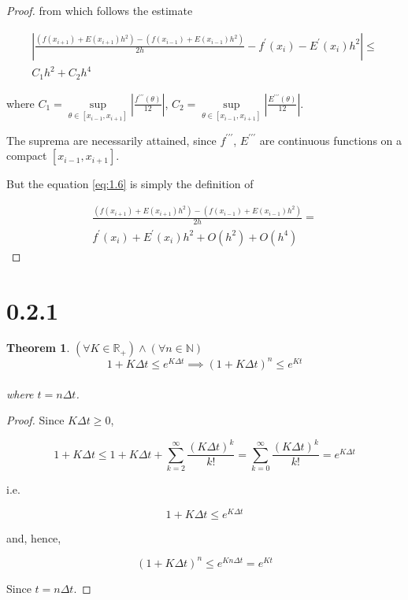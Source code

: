 \documentclass[a4paper]{amsproc}
\theoremstyle{plain}
\newtheorem*{thm}{Theorem}
\theoremstyle{definition}
\theoremstyle{remark}
\numberwithin{equation}{section}
\renewcommand{\le}{\leqslant}\renewcommand{\leq}{\leqslant}
\renewcommand{\ge}{\geqslant}\renewcommand{\geq}{\geqslant}
\begin{document}
\begin{proof}
from which follows the estimate

\begin{multline}\label{eq:1.6}
\left\lvert \frac{(f(x_{i+1})+E(x_{i+1})h^2)-(f(x_{i-1})+E(x_{i-1})h^2)}{2h} - f^{\prime}(x_i)-E^{\prime}(x_i)h^2 \right\rvert \le \\ 
C_1 h^2+C_2 h^4
\end{multline}
 
where $ C_1 = \underset{\theta \in [x_{i-1}, x_{i+1}]}{\sup} \left\lvert \frac{f^{\prime \prime \prime}(\theta)}{12} \right\rvert $, $ C_2 = \underset{\theta \in [x_{i-1}, x_{i+1}]}{\sup} \left\lvert \frac{E^{\prime \prime \prime}(\theta)}{12} \right\rvert $.

The suprema are necessarily attained, since $f^{\prime \prime \prime}$, $E^{\prime \prime \prime}$ are continuous functions on a compact $[x_{i-1}, x_{i+1}]$.

But the equation \eqref{eq:1.6} is simply the definition of 

 \begin{multline}\label{eq:1.7} 
\frac{(f(x_{i+1})+E(x_{i+1})h^2)-(f(x_{i-1})+E(x_{i-1})h^2)}{2h} = \\ 
f^{\prime}(x_i)+E^{\prime}(x_i)h^2+O(h^2)+O(h^4)
\end{multline}

\end{proof}

\section*{0.2.1}

\begin{thm} \label{some label}
$(\forall K \in \mathbb{R_+}) \wedge (\forall n \in \mathbb{N})$ \begin{equation} 1+K\Delta t \le e^{K\Delta t} \implies (1+K\Delta t)^n \le e^{Kt}\end{equation} \\ where $ t = n\Delta t$.  
\end{thm}

\begin{proof}

Since $K\Delta t \ge 0$,

\begin{equation}\label{eq:2.1}  
1+K\Delta t \le 1+K\Delta t + \sum^{\infty}_{k = 2} \frac{(K\Delta t)^k}{k!} = \sum^{\infty}_{k = 0} \frac{(K\Delta t)^k}{k!}= e^{K\Delta t} \end{equation}

i.e.

\begin{equation}\label{eq:2.2}  
1+K\Delta t \le e^{K\Delta t} 
\end{equation}

and, hence,

\begin{equation}\label{eq:2.3} 
(1+K\Delta t)^n \le e^{Kn\Delta t} = e^{Kt} 
\end{equation}

Since $ t = n\Delta t$. 

\end{proof}
\end{document}
